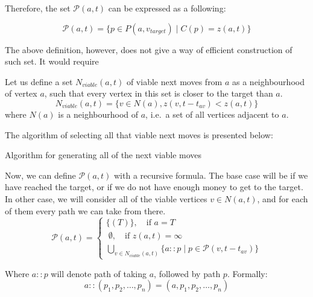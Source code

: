 \documentclass[12pt]{article}
\newcommand*{\p}{\ensuremath{\mathcal{P}}}
\newcommand*{\target}{\ensuremath{v_{target}}}
\begin{document}
Therefore, the set $\p(a,t)$ can be expressed as a following:

\begin{equation*}
    \p(a,t) = \big\{ p \in P(a,\target) \mid C(p) = z(a,t) \big\}
\end{equation*}

The above definition, however, does not give a way of efficient construction of such set.
It would require

Let us define a set $N_{viable}(a,t)$ of viable next moves from $a$ as a neighbourhood of vertex $a$, such that
every vertex in this set is closer to the target than $a$.
\begin{equation}
    N_{viable}(a,t) = \big\{ v \in N(a) , z(v,t-t_{av}) < z(a, t) \big\}
\end{equation}
where $N(a)$ is a neighbourhood of $a$, i.e.\ a set of all vertices adjacent to $a$.

The algorithm of selecting all that viable next moves is presented below:

\begin{algorithm}
    \DontPrintSemicolon
    \caption{Algorithm for generating all of the next viable moves}
    \label{alg:viable_next_moves}
\end{algorithm}

Now, we can define $\p(a,t)$ with a recursive formula.
The base case will be if we have reached the target, or if we do not have enough money to get to the target.
In other case, we will consider all of the viable vertices $v \in N(a,t)$, and for each of them every path we can take from there.
\begin{equation}
    \p(a,t) =
    \begin{cases}
        \big\{ (T) \big\}, \quad \text{if $a = T$}     \\[1ex]
        \;\emptyset, \quad \text{if $z(a,t) = \infty$} \\[1ex]
        \bigcup\limits_{v \in N_{viable}(a,t)} \Big\{ a::p \mid p \in \p(v, t-t_{av}) \Big\}
    \end{cases}
\end{equation}

Where $a :: p$ will denote path of taking $a$, followed by path $p$.
Formally:
\begin{equation*}
    a :: (p_1, p_2, \ldots, p_n) = (a, p_1, p_2, \ldots, p_n)
\end{equation*}
\end{document}
